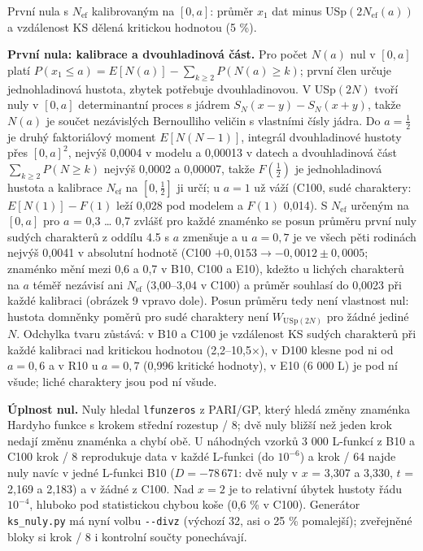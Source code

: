 \documentclass[
  10pt,
]{article}
\begin{document}
První nula s \(N_{\mathrm{ef}}\) kalibrovaným na \([0, a]\): průměr
\(x_1\) dat minus USp\((2N_{\mathrm{ef}}(a))\) a vzdálenost KS dělená
kritickou hodnotou (5 \%).

\textbf{První nula: kalibrace a dvouhladinová část.} Pro počet \(N(a)\)
nul v \([0, a]\) platí
\(P(x_1 \le a) = E[N(a)] - \sum_{k \ge 2} P(N(a) \ge k)\); první člen
určuje jednohladinová hustota, zbytek potřebuje dvouhladinovou. V
USp\((2N)\) tvoří nuly v \([0, a]\) determinantní proces s jádrem
\(S_N(x - y) - S_N(x + y)\), takže \(N(a)\) je součet nezávislých
Bernoulliho veličin s vlastními čísly jádra. Do \(a = \frac12\) je druhý
faktoriálový moment \(E[N(N - 1)]\), integrál dvouhladinové hustoty přes
\([0, a]^2\), nejvýš 0,0004 v modelu a 0,00013 v datech a dvouhladinová
část \(\sum_{k \ge 2} P(N \ge k)\) nejvýš 0,0002 a 0,00007, takže
\(F(\frac12)\) je jednohladinová hustota a kalibrace \(N_{\mathrm{ef}}\)
na \([0, \frac12]\) ji určí; u \(a = 1\) už váží (C100, sudé charaktery:
\(E[N(1)] - F(1)\) leží 0,028 pod modelem a \(F(1)\) 0,014). S
\(N_{\mathrm{ef}}\) určeným na \([0, a]\) pro \(a\) = 0,3 \ldots{} 0,7
zvlášť pro každé znaménko se posun průměru první nuly sudých charakterů
z oddílu 4.5 s \(a\) zmenšuje a u \(a = 0{,}7\) je ve všech pěti
rodinách nejvýš 0,0041 v absolutní hodnotě (C100
\(+0{,}0153 \to -0{,}0012 \pm 0{,}0005\); znaménko mění mezi 0,6 a 0,7 v
B10, C100 a E10), kdežto u lichých charakterů na \(a\) téměř nezávisí
ani \(N_{\mathrm{ef}}\) (3,00--3,04 v C100) a průměr souhlasí do 0,0023
při každé kalibraci (obrázek 9 vpravo dole). Posun průměru tedy není
vlastnost nul: hustota domněnky poměrů pro sudé charaktery není
\(W_{\mathrm{USp}(2N)}\) pro žádné jediné \(N\). Odchylka tvaru zůstává:
v B10 a C100 je vzdálenost KS sudých charakterů při každé kalibraci nad
kritickou hodnotou (2,2--10,5×), v D100 klesne pod ni od \(a = 0{,}6\) a
v R10 u \(a = 0{,}7\) (0,996 kritické hodnoty), v E10 (6 000 L) je pod
ní všude; liché charaktery jsou pod ní všude.

\textbf{Úplnost nul.} Nuly hledal \texttt{lfunzeros} z PARI/GP, který
hledá změny znaménka Hardyho funkce s krokem střední rozestup / 8; dvě
nuly bližší než jeden krok nedají změnu znaménka a chybí obě. U
náhodných vzorků 3 000 L-funkcí z B10 a C100 krok / 8 reprodukuje data v
každé L-funkci (do \(10^{-6}\)) a krok / 64 najde nuly navíc v jedné
L-funkci B10 (\(D = -78\,671\): dvě nuly v \(x\) = 3,307 a 3,330, \(t\)
= 2,169 a 2,183) a v žádné z C100. Nad \(x = 2\) je to relativní úbytek
hustoty řádu \(10^{-4}\), hluboko pod statistickou chybou koše (0,6 \% v
C100). Generátor \texttt{ks\_nuly.py} má nyní volbu \texttt{-\/-divz}
(výchozí 32, asi o 25 \% pomalejší); zveřejněné bloky si krok / 8 i
kontrolní součty ponechávají.
\end{document}
